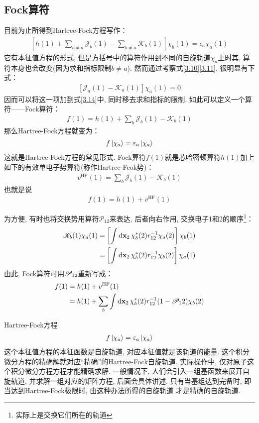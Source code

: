\subsection{Fock算符}
目前为止所得到Hartree-Fock方程写作：
\begin{align}
\label{3.14}
\left[ h(1) + \sum_{b\neq a}\mathscr{J}_b(1) - \sum_{b\neq a}\mathscr{K}_b(1)   \right]\chi_b(1) = \epsilon_a\chi_a(1)
\end{align}
它有本征值方程的形式, 但是方括号中的算符作用到不同的自旋轨道$\chi_a$上时其, 算符本身也会改变(因为求和指标限制$b\neq a$). 然而通过考察式\eqref{3.10}\eqref{3.11}, 很明显有下式：
\begin{align}
\left[ \mathscr{J}_a(1) - \mathscr{K}_a(1)  \right]\chi_a(1) = 0
\end{align}
因而可以将这一项加到式\eqref{3.14}中, 同时移去求和指标的限制, 如此可以定义一个算符——Fock算符：
\begin{align}
\label{3.16}
f(1) = h(1) + \sum_{b}\mathscr{J}_b(1) - \mathscr{K}_b(1)
\end{align}
那么Hartree-Fock方程就变为：
\begin{align}
\label{3.17}
f\Ket{\chi_a} = \varepsilon_a\Ket{\chi_a}
\end{align}
这就是Hartree-Fock方程的常见形式. Fock算符$f(1)$就是芯哈密顿算符$h(1)$加上如下的有效单电子势算符(称作Hartree-Fcok势)：
\begin{align}
\label{3.18}
v^\mathrm{HF}(1) = \sum_b\mathscr{J}_b(1) - \mathscr{K}_b(1)
\end{align}
也就是说
\begin{align}
f(1) = h(1) + v^\mathrm{HF}(1)
\end{align}

为方便, 有时也将交换势用算符$\mathscr{P}_12$来表达, 后者向右作用, 交换电子1和2的顺序\footnote{
实际上是交换它们所在的轨道
}：
\begin{align}
\scr{K}_b(1)\chi_a(1) & = \left[ \int\dd{x}_2\,\chi_b^*(2)r_{12}^{-1}\chi_a(2) \right]\chi_b(1)\notag\\
& = \left[ \int\dd{x}_2\,\chi_b^*(2)r_{12}^{-1}\chi_b(2) \right]\chi_a(1)
\end{align}
由此, Fock算符可用$\mathscr{P}_{12}$重新写成：
\begin{align}
f(1) & = h(1) + v^\mathrm{HF}(1) \notag \\
     & = h(1) + \sum_b\int\dd{x}_2\,\chi_b^*(2)\twoe(1-\scr{P}_12)\chi_b(2)
\end{align}

Hartree-Fock方程
\begin{align}
f\Ket{\chi_a} = \varepsilon_a\Ket{\chi_a}
\end{align}
这个本征值方程的本征函数是自旋轨道, 对应本征值就是该轨道的能量. 这个积分微分方程的精确解就对应“精确”的Hartree-Fock自旋轨道. 实际操作中, 仅对原子这个积分微分方程方程才能精确求解. 一般情况下, 人们会引入一组基函数来展开自旋轨道, 并求解一组对应的矩阵方程, 后面会具体讲述. 只有当基组达到完备时, 即当达到Hartree-Fock极限时, 由这种办法所得的自旋轨道 才是精确的\hft 自旋轨道.

